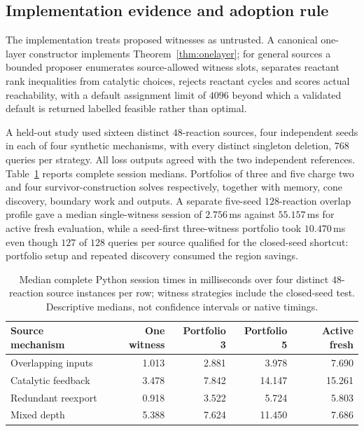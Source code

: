 \documentclass[11pt,a4paper]{article}
\theoremstyle{plain}
\theoremstyle{definition}
\theoremstyle{remark}
\begin{document}
\subsection{Implementation evidence and adoption rule}\label{sec:selection-impl}

The implementation treats proposed witnesses as untrusted. A canonical one-layer constructor implements Theorem~\ref{thm:onelayer}; for general sources a bounded proposer enumerates source-allowed witness slots, separates reactant rank inequalities from catalytic choices, rejects reactant cycles and scores actual reachability, with a default assignment limit of $4096$ beyond which a validated default is returned labelled feasible rather than optimal.

A held-out study used sixteen distinct $48$-reaction sources, four independent seeds in each of four synthetic mechanisms, with every distinct singleton deletion, $768$ queries per strategy. All loss outputs agreed with the two independent references. Table~\ref{tab:portfolio} reports complete session medians. Portfolios of three and five charge two and four survivor-construction solves respectively, together with memory, cone discovery, boundary work and outputs. A separate five-seed $128$-reaction overlap profile gave a median single-witness session of $2.756$\,ms against $55.157$\,ms for active fresh evaluation, while a seed-first three-witness portfolio took $10.470$\,ms even though $127$ of $128$ queries per source qualified for the closed-seed shortcut: portfolio setup and repeated discovery consumed the region savings.

\begin{table}[t]
\centering\small
\begin{tabular}{@{}lrrrr@{}}
\toprule
Source mechanism & One witness & Portfolio 3 & Portfolio 5 & Active fresh \\
\midrule
Overlapping inputs & 1.013 & 2.881 & 3.978 & 7.690 \\
Catalytic feedback & 3.478 & 7.842 & 14.147 & 15.261 \\
Redundant reexport & 0.918 & 3.522 & 5.724 & 5.803 \\
Mixed depth & 5.388 & 7.624 & 11.450 & 7.686 \\
\bottomrule
\end{tabular}
\caption{Median complete Python session times in milliseconds over four distinct $48$-reaction source instances per row; witness strategies include the closed-seed test. Descriptive medians, not confidence intervals or native timings.}
\label{tab:portfolio}
\end{table}
\end{document}
